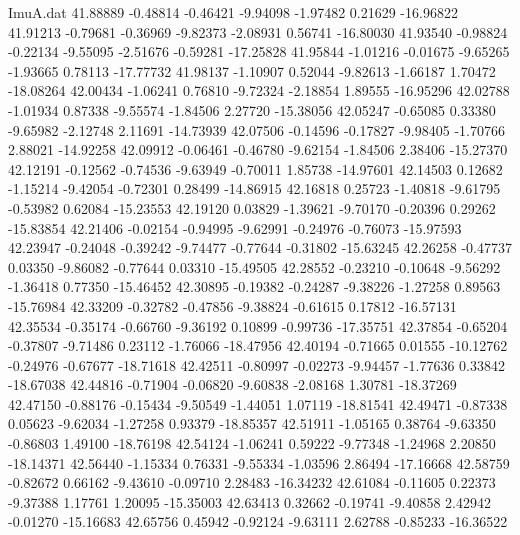 \begin{filecontents}{ImuA.dat}
  41.88889   -0.48814   -0.46421   -9.94098   -1.97482    0.21629  -16.96822
  41.91213   -0.79681   -0.36969   -9.82373   -2.08931    0.56741  -16.80030
  41.93540   -0.98824   -0.22134   -9.55095   -2.51676   -0.59281  -17.25828
  41.95844   -1.01216   -0.01675   -9.65265   -1.93665    0.78113  -17.77732
  41.98137   -1.10907    0.52044   -9.82613   -1.66187    1.70472  -18.08264
  42.00434   -1.06241    0.76810   -9.72324   -2.18854    1.89555  -16.95296
  42.02788   -1.01934    0.87338   -9.55574   -1.84506    2.27720  -15.38056
  42.05247   -0.65085    0.33380   -9.65982   -2.12748    2.11691  -14.73939
  42.07506   -0.14596   -0.17827   -9.98405   -1.70766    2.88021  -14.92258
  42.09912   -0.06461   -0.46780   -9.62154   -1.84506    2.38406  -15.27370
  42.12191   -0.12562   -0.74536   -9.63949   -0.70011    1.85738  -14.97601
  42.14503    0.12682   -1.15214   -9.42054   -0.72301    0.28499  -14.86915
  42.16818    0.25723   -1.40818   -9.61795   -0.53982    0.62084  -15.23553
  42.19120    0.03829   -1.39621   -9.70170   -0.20396    0.29262  -15.83854
  42.21406   -0.02154   -0.94995   -9.62991   -0.24976   -0.76073  -15.97593
  42.23947   -0.24048   -0.39242   -9.74477   -0.77644   -0.31802  -15.63245
  42.26258   -0.47737    0.03350   -9.86082   -0.77644    0.03310  -15.49505
  42.28552   -0.23210   -0.10648   -9.56292   -1.36418    0.77350  -15.46452
  42.30895   -0.19382   -0.24287   -9.38226   -1.27258    0.89563  -15.76984
  42.33209   -0.32782   -0.47856   -9.38824   -0.61615    0.17812  -16.57131
  42.35534   -0.35174   -0.66760   -9.36192    0.10899   -0.99736  -17.35751
  42.37854   -0.65204   -0.37807   -9.71486    0.23112   -1.76066  -18.47956
  42.40194   -0.71665    0.01555  -10.12762   -0.24976   -0.67677  -18.71618
  42.42511   -0.80997   -0.02273   -9.94457   -1.77636    0.33842  -18.67038
  42.44816   -0.71904   -0.06820   -9.60838   -2.08168    1.30781  -18.37269
  42.47150   -0.88176   -0.15434   -9.50549   -1.44051    1.07119  -18.81541
  42.49471   -0.87338    0.05623   -9.62034   -1.27258    0.93379  -18.85357
  42.51911   -1.05165    0.38764   -9.63350   -0.86803    1.49100  -18.76198
  42.54124   -1.06241    0.59222   -9.77348   -1.24968    2.20850  -18.14371
  42.56440   -1.15334    0.76331   -9.55334   -1.03596    2.86494  -17.16668
  42.58759   -0.82672    0.66162   -9.43610   -0.09710    2.28483  -16.34232
  42.61084   -0.11605    0.22373   -9.37388    1.17761    1.20095  -15.35003
  42.63413    0.32662   -0.19741   -9.40858    2.42942   -0.01270  -15.16683
  42.65756    0.45942   -0.92124   -9.63111    2.62788   -0.85233  -16.36522

\end{filecontents}
